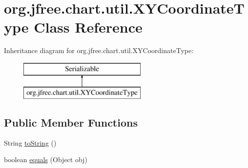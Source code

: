 \hypertarget{classorg_1_1jfree_1_1chart_1_1util_1_1_x_y_coordinate_type}{}\section{org.\+jfree.\+chart.\+util.\+X\+Y\+Coordinate\+Type Class Reference}
\label{classorg_1_1jfree_1_1chart_1_1util_1_1_x_y_coordinate_type}
Inheritance diagram for org.\+jfree.\+chart.\+util.\+X\+Y\+Coordinate\+Type\+:\begin{figure}[H]
\begin{center}
\leavevmode
\includegraphics[height=2.000000cm]{classorg_1_1jfree_1_1chart_1_1util_1_1_x_y_coordinate_type}
\end{center}
\end{figure}
\subsection*{Public Member Functions}
\begin{DoxyCompactItemize}
\item 
String \mbox{\hyperlink{classorg_1_1jfree_1_1chart_1_1util_1_1_x_y_coordinate_type_a2a6cecbb4da150439540f37919cd2988}{to\+String}} ()
\item 
boolean \mbox{\hyperlink{classorg_1_1jfree_1_1chart_1_1util_1_1_x_y_coordinate_type_a7584dd8d0e9b47887303cc4226671120}{equals}} (Object obj)
\end{DoxyCompactItemize}
